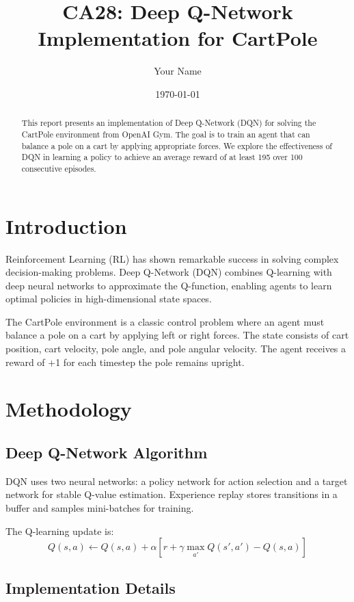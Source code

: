 \documentclass{article}
\title{CA28: Deep Q-Network Implementation for CartPole}
\author{Your Name}
\date{\today}
\begin{document}
\maketitle

\begin{abstract}
This report presents an implementation of Deep Q-Network (DQN) for solving the CartPole environment from OpenAI Gym. The goal is to train an agent that can balance a pole on a cart by applying appropriate forces. We explore the effectiveness of DQN in learning a policy to achieve an average reward of at least 195 over 100 consecutive episodes.
\end{abstract}

\section{Introduction}

Reinforcement Learning (RL) has shown remarkable success in solving complex decision-making problems. Deep Q-Network (DQN) combines Q-learning with deep neural networks to approximate the Q-function, enabling agents to learn optimal policies in high-dimensional state spaces.

The CartPole environment is a classic control problem where an agent must balance a pole on a cart by applying left or right forces. The state consists of cart position, cart velocity, pole angle, and pole angular velocity. The agent receives a reward of +1 for each timestep the pole remains upright.

\section{Methodology}

\subsection{Deep Q-Network Algorithm}

DQN uses two neural networks: a policy network for action selection and a target network for stable Q-value estimation. Experience replay stores transitions in a buffer and samples mini-batches for training.

The Q-learning update is:
\[
Q(s, a) \leftarrow Q(s, a) + \alpha \left[ r + \gamma \max_{a'} Q(s', a') - Q(s, a) \right]
\]

\subsection{Implementation Details}
\end{document}
